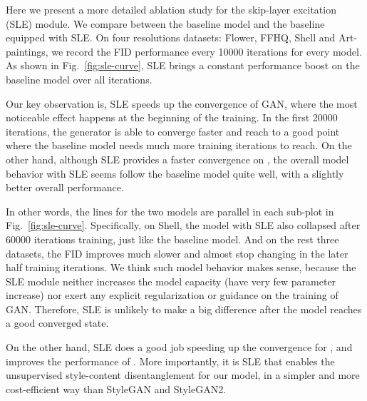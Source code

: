 \documentclass{article} \usepackage{iclr2021_conference,times}
\begin{document}
Here we present a more detailed ablation study for the skip-layer excitation (SLE) module. We compare between the baseline model and the baseline equipped with SLE. On four  resolutions datasets: Flower, FFHQ, Shell and Art-paintings, we record the FID performance every 10000 iterations for every model. As shown in Fig.~\ref{fig:sle-curve}, SLE brings a constant performance boost on the baseline model over all iterations.

Our key observation is, SLE speeds up the convergence of GAN, where the most noticeable effect happens at the beginning of the training. In the first 20000 iterations, the generator  is able to converge faster and reach to a good point where the baseline model needs much more training iterations to reach. On the other hand, although SLE provides a faster convergence on , the overall model behavior with SLE seems follow the baseline model quite well, with a slightly better overall performance. 

In other words, the lines for the two models are parallel in each sub-plot in Fig.~\ref{fig:sle-curve}. Specifically, on Shell, the model with SLE also collapsed after 60000 iterations training, just like the baseline model. And on the rest three datasets, the FID improves much slower and almost stop changing in the later half training iterations. We think such model behavior makes sense, because the SLE module neither increases the model capacity (have very few parameter increase) nor exert any explicit regularization or guidance on the training of GAN. Therefore, SLE is unlikely to make a big difference after the model reaches a good converged state.


On the other hand, SLE does a good job speeding up the convergence for , and improves the performance of . More importantly, it is SLE that enables the unsupervised style-content disentanglement for our model, in a simpler and more cost-efficient way than StyleGAN and StyleGAN2. 
\end{document}
